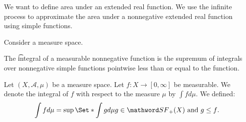 

We want to define area under an extended real function.
We use the infinite process to approximate the area under a nonnegative extended real function using simple functions.


Consider a measure space.

The \t{integral} of a measurable nonnegative function is the supremum of integrals over nonnegative simple functions pointwise less than or equal to the function.


Let $(X, \mathcal{A}, \mu)$ be a measure space.
Let $f: X \to [0, \infty]$ be measurable.
We denote the integral of $f$ with respect to the measure $\mu$ by $\int f d \mu$.
We defined:
\[
  \int f d\mu = \sup \Set*{\int g d \mu}{g \in \SimpleF_+(X) \text{ and } g \leq f}.
\]
